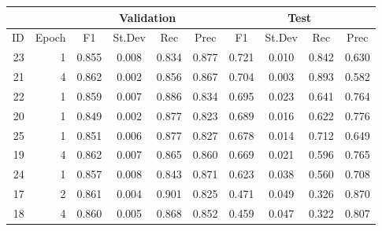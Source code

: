 \begin{tabular}{rr|cccc|cccc}
    \hline
            &        &             \multicolumn{4}{c|}{Validation}   & \multicolumn{4}{c}{Test} \\
    \hline
         ID &  Epoch &       F1 &      St.Dev &      Rec &      Prec &       F1 &       St.Dev &  Rec      &       Prec \\
    \hline
 23 &      1 &    0.855 &          0.008 &    0.834 &     0.877 &    0.721 &           0.010 &     0.842 &      0.630 \\
 21 &      4 &    0.862 &          0.002 &    0.856 &     0.867 &    0.704 &           0.003 &     0.893 &      0.582 \\
 22 &      1 &    0.859 &          0.007 &    0.886 &     0.834 &    0.695 &           0.023 &     0.641 &      0.764 \\
 20 &      1 &    0.849 &          0.002 &    0.877 &     0.823 &    0.689 &           0.016 &     0.622 &      0.776 \\
 25 &      1 &    0.851 &          0.006 &    0.877 &     0.827 &    0.678 &           0.014 &     0.712 &      0.649 \\
 19 &      4 &    0.862 &          0.007 &    0.865 &     0.860 &    0.669 &           0.021 &     0.596 &      0.765 \\
 24 &      1 &    0.857 &          0.008 &    0.843 &     0.871 &    0.623 &           0.038 &     0.560 &      0.708 \\
 17 &      2 &    0.861 &          0.004 &    0.901 &     0.825 &    0.471 &           0.049 &     0.326 &      0.870 \\
 18 &      4 &    0.860 &          0.005 &    0.868 &     0.852 &    0.459 &           0.047 &     0.322 &      0.807 \\
 \hline
\end{tabular}
